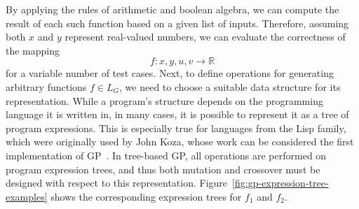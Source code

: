 By applying the rules of arithmetic and boolean algebra, we can compute the result of each such function based on a given list of inputs.
Therefore, assuming both $x$ and $y$ represent real-valued numbers, we can evaluate the correctness of the mapping 
\begin{equation*}
    f: x, y, u, v \to \mathbb{R}
\end{equation*}
for a variable number of test cases.
Next, to define operations for generating arbitrary functions $f \in L_G$, we need to choose a suitable data structure for its representation.
While a program's structure depends on the programming language it is written in, in many cases, it is possible to represent it as a tree of program expressions.
This is especially true for languages from the Lisp family, which were originally used by John Koza, whose work can be considered the first implementation of GP~\cite{koza1994genetic}.
In tree-based GP, all operations are performed on program expression trees, and thus both mutation and crossover must be designed with respect to this representation.
Figure~\ref{fig:gp-expression-tree-examples} shows the corresponding expression trees for $f_1$ and $f_2$.
